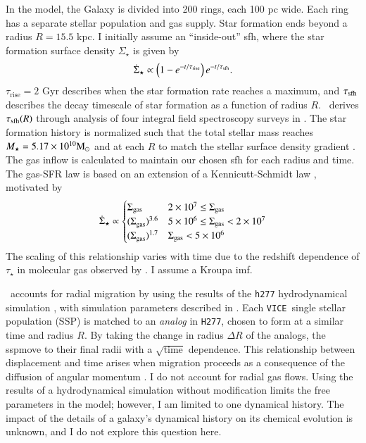 \documentclass[12pt,oneside,letterpaper]{report}
\newcommand{\sfh}{\gls{sfh}}
\newcommand{\ssp}{\gls{ssp}}
\newcommand{\imf}{\gls{imf}}
\newcommand{\JJ}{\citetalias{james+21}}
\newcommand{\VICE}{\texttt{VICE}}
\begin{document}
In the model, the Galaxy is divided into 200 rings, each 100 pc wide. Each ring has a separate stellar population and gas supply. Star formation ends beyond a radius $R=15.5$ kpc. I initially assume an ``inside-out'' \sfh{}, where the star formation surface density $\Sigma_\star$ is given by 
\begin{equation}
    \dot{\Sigma}_\star \propto \left(1-e^{-t/\tau_{\rm rise}}\right) e^{-t/\tau_{\rm sfh}}.
\end{equation}
$\tau_\text{rise}=2$ Gyr describes when the star formation rate reaches a maximum, and $\tau_{\rm sfh}$ describes the decay timescale of star formation as a function of radius $R$. \JJ~derives $\tau_{\rm sfh}(R)$ through analysis of four integral field spectroscopy surveys in \cite{sanches20}. The star formation history is normalized such that the total stellar mass reaches $M_\star=5.17\times10^{10} {\rm M}_\odot$ \citep{LM15} and at each $R$ to match the stellar surface density gradient \citep{BHG16}.
The gas inflow is calculated to maintain our chosen \sfh{} for each radius and time. The gas-SFR law is based on an extension of a Kennicutt-Schmidt law \citep{kennicutt98}, motivated by 
\begin{equation}
\dot{\Sigma}_{\star} \propto 
\begin{cases}
    {\Sigma}_{\rm gas} & 2\times 10^7 \leq \Sigma_{\rm gas} \\ 
    {(\Sigma}_{\rm gas})^{3.6} & 5\times 10^6 \leq \Sigma_{\rm gas} < 2\times10^7 \\ 
    {(\Sigma}_{\rm gas})^{1.7} & \Sigma_{\rm gas} < 5\times10^6 \\ 
\end{cases}
\end{equation}
The scaling of this relationship varies with time due to the redshift dependence of $\tau_\star$ in molecular gas observed by \citet{tacconi18}. I assume a Kroupa \imf \cite{kroupa01}.


\JJ\ accounts for radial migration by using the results of the \texttt{h277} hydrodynamical simulation \citep{christensen12, zolotov12, loebman12, BZ14}, with simulation parameters described in \citet{bird+21}. Each \VICE\ single stellar population (SSP) is matched to an \textit{analog} in \texttt{H277}, chosen to form at a similar time and radius $R$. By taking the change in radius $\Delta R$ of the analogs, the \ssp move to their final radii with a $\sqrt{\text{time}}$ dependence.
This relationship between displacement and time arises when migration proceeds as a consequence of the diffusion of angular momentum \citep{frankel18, frankel20}.
I do not account for radial gas flows.
Using the results of a hydrodynamical simulation without modification limits the free parameters in the model; however, I am limited to one dynamical history. The impact of the details of a galaxy's dynamical history on its chemical evolution is unknown, and I do not explore this question here.
\end{document}
